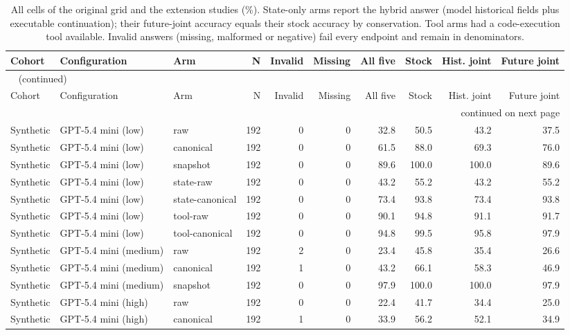 {\scriptsize\setlength{\tabcolsep}{2pt}
\begin{longtable}{lllrrrrrrr}
\caption{All cells of the original grid and the extension studies (\%). State-only arms report the hybrid answer (model historical fields plus executable continuation); their future-joint accuracy equals their stock accuracy by conservation. Tool arms had a code-execution tool available. Invalid answers (missing, malformed or negative) fail every endpoint and remain in denominators.}\label{tab:allcells} \\
\toprule
Cohort & Configuration & Arm & N & Invalid & Missing & All five & Stock & Hist. joint & Future joint \\
\midrule
\endfirsthead
\multicolumn{10}{l}{\tablename~\thetable{} (continued)} \\
\toprule
Cohort & Configuration & Arm & N & Invalid & Missing & All five & Stock & Hist. joint & Future joint \\
\midrule
\endhead
\midrule
\multicolumn{10}{r}{continued on next page} \\
\endfoot
\bottomrule
\endlastfoot
Synthetic & GPT-5.4 mini (low) & raw & 192 & 0 & 0 & 32.8 & 50.5 & 43.2 & 37.5 \\
Synthetic & GPT-5.4 mini (low) & canonical & 192 & 0 & 0 & 61.5 & 88.0 & 69.3 & 76.0 \\
Synthetic & GPT-5.4 mini (low) & snapshot & 192 & 0 & 0 & 89.6 & 100.0 & 100.0 & 89.6 \\
Synthetic & GPT-5.4 mini (low) & state-raw & 192 & 0 & 0 & 43.2 & 55.2 & 43.2 & 55.2 \\
Synthetic & GPT-5.4 mini (low) & state-canonical & 192 & 0 & 0 & 73.4 & 93.8 & 73.4 & 93.8 \\
Synthetic & GPT-5.4 mini (low) & tool-raw & 192 & 0 & 0 & 90.1 & 94.8 & 91.1 & 91.7 \\
Synthetic & GPT-5.4 mini (low) & tool-canonical & 192 & 0 & 0 & 94.8 & 99.5 & 95.8 & 97.9 \\
Synthetic & GPT-5.4 mini (medium) & raw & 192 & 2 & 0 & 23.4 & 45.8 & 35.4 & 26.6 \\
Synthetic & GPT-5.4 mini (medium) & canonical & 192 & 1 & 0 & 43.2 & 66.1 & 58.3 & 46.9 \\
Synthetic & GPT-5.4 mini (medium) & snapshot & 192 & 0 & 0 & 97.9 & 100.0 & 100.0 & 97.9 \\
Synthetic & GPT-5.4 mini (high) & raw & 192 & 0 & 0 & 22.4 & 41.7 & 34.4 & 25.0 \\
Synthetic & GPT-5.4 mini (high) & canonical & 192 & 1 & 0 & 33.9 & 56.2 & 52.1 & 34.9 \\

\end{longtable}}
